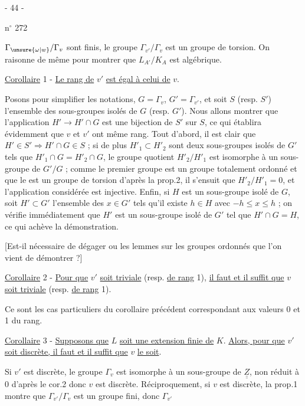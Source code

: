 \begin{center}- 44 -\end{center}
\hfill n$^\circ$ 272

$\Gamma_{\unsure{\omega|w}}/\Gamma_v$ sont finis, le groupe $\Gamma_{v'}/\Gamma_v$ est un groupe de torsion. On raisonne de même pour montrer que $L_{A'}/K_A$ est algébrique.

\uline{Corollaire} 1 - \uline{Le rang de} $v'$ \uline{est égal à celui de} $v$.

Posons pour simplifier les notations, $G=\Gamma_v$, $G'=\Gamma_{v'}$, et soit $S$ (resp. $S'$) l'ensemble des sous-groupes isolés de $G$ (resp. $G'$). Nous allons montrer que l'application $H'\longrightarrow H'\cap G$ est une bijection de $S'$ sur $S$, ce qui établira évidemment que $v$ et $v'$ ont même rang. Tout d'abord, il est clair que $H'\in S'\Longrightarrow H'\cap G\in S$ ; si de plus $H'_1\subset H'_2$ sont deux sous-groupes isolés de $G'$ tels que $H'_1\cap G=H'_2\cap G$, le groupe quotient $H'_2/H'_1$ est isomorphe à un sous-groupe de $G'/G$ ; comme le premier groupe est un groupe totalement ordonné et que le  est un groupe de torsion d'après la prop.2, il s'ensuit que $H'_2/H'_1=0$, et l'application considérée est injective. Enfin, si $H$ est un sous-groupe isolé de $G$, soit $H'\subset G'$ l'ensemble des $x\in G'$ tels qu'il existe $h\in H$ avec $-h\leqslant x\leqslant h$ ; on vérifie immédiatement que $H'$ est un sous-groupe isolé de $G'$ tel que $H'\cap G=H$, ce qui achève la démonstration.

[Est-il nécessaire de dégager  ou les lemmes sur les groupes ordonnés que l'on vient  de démontrer ?]

\uline{Corollaire} 2 - \uline{Pour que} $v'$ \uline{soit triviale} (resp. \uline{de rang} 1), \uline{il faut et il suffit que} $v$ \uline{soit triviale} (resp. \uline{de rang} 1).

Ce sont les cas particuliers du corollaire précédent correspondant aux valeurs 0 et 1 du rang.

\uline{Corollaire} 3 - \uline{Supposons que} $L$ \uline{soit une extension finie de} $K$. \uline{Alors, pour que} $v'$ \uline{soit discrète, il faut et il suffit que} $v$ \uline{le soit}.

Si $v'$ est discrète, le groupe $\Gamma_v$ est isomorphe à un sous-groupe de $\underline{\underline Z}$, non réduit à 0 d'après le cor.2 donc $v$ est discrète. Réciproquement, si $v$ est discrète, la prop.1 montre que $\Gamma_{v'}/\Gamma_v$ est un groupe fini, donc $\Gamma_{v'}$

